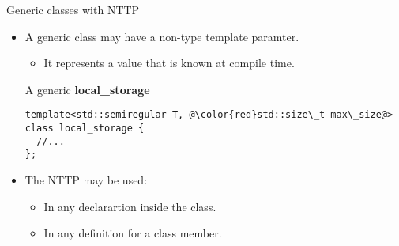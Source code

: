 \begin{frame}[t,fragile]{Generic classes with NTTP}
\begin{itemize}
  \item A generic class may have a non-type template paramter.
    \begin{itemize}
      \item It represents a value that is known at compile time.
    \end{itemize}

\begin{block}{A generic \textbf{local\_storage}}
\begin{lstlisting}[escapechar=@]
template<std::semiregular T, @\color{red}std::size\_t max\_size@>
class local_storage {
  //...
};
\end{lstlisting}
\end{block}

  \item The NTTP may be used:
    \begin{itemize}
      \item In any declarartion inside the class.
      \item In any definition for a class member.
    \end{itemize}
\end{itemize}
\end{frame}


